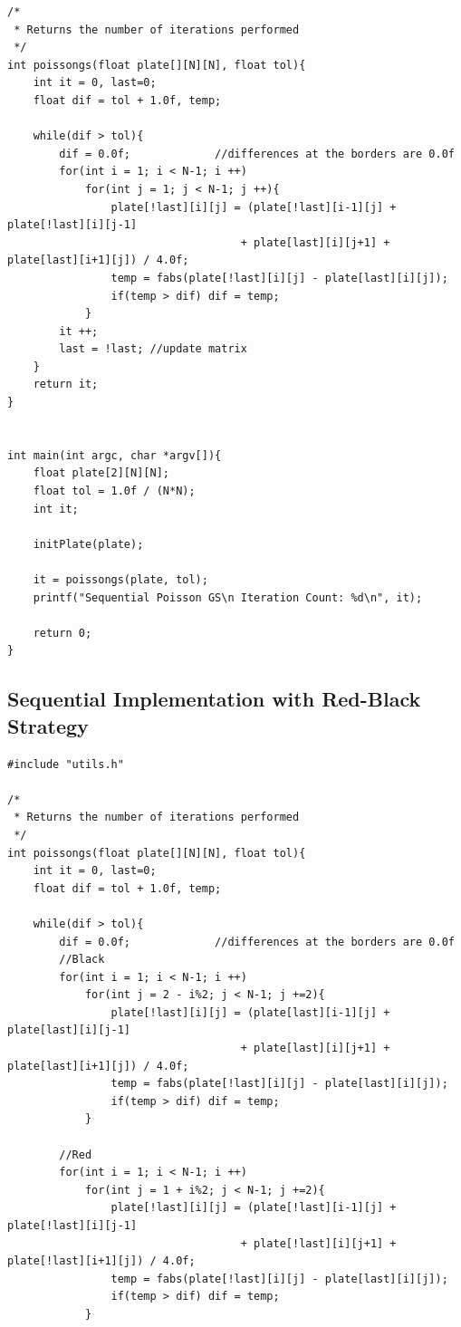 \documentclass{article}
\begin{document}
\begin{appendices}
\begin{framed}
\begin{verbatim}
/*
 * Returns the number of iterations performed
 */
int poissongs(float plate[][N][N], float tol){
    int it = 0, last=0;
    float dif = tol + 1.0f, temp;

    while(dif > tol){
        dif = 0.0f;             //differences at the borders are 0.0f
        for(int i = 1; i < N-1; i ++)
            for(int j = 1; j < N-1; j ++){
                plate[!last][i][j] = (plate[!last][i-1][j] + plate[!last][i][j-1] 
                                    + plate[last][i][j+1] + plate[last][i+1][j]) / 4.0f;
                temp = fabs(plate[!last][i][j] - plate[last][i][j]);
                if(temp > dif) dif = temp;
            }
        it ++;
        last = !last; //update matrix
    }
    return it;
}


int main(int argc, char *argv[]){
    float plate[2][N][N];
    float tol = 1.0f / (N*N);
    int it;

    initPlate(plate);

    it = poissongs(plate, tol);
    printf("Sequential Poisson GS\n Iteration Count: %d\n", it);

    return 0;
}
\end{verbatim}
\end{framed}

\subsection{Sequential Implementation with Red-Black Strategy}\label{seqRBImp}
\begin{framed}
\begin{verbatim}
#include "utils.h"

/*
 * Returns the number of iterations performed
 */
int poissongs(float plate[][N][N], float tol){
    int it = 0, last=0;
    float dif = tol + 1.0f, temp;

    while(dif > tol){
        dif = 0.0f;             //differences at the borders are 0.0f
        //Black
        for(int i = 1; i < N-1; i ++)
            for(int j = 2 - i%2; j < N-1; j +=2){
                plate[!last][i][j] = (plate[last][i-1][j] + plate[last][i][j-1] 
                                    + plate[last][i][j+1] + plate[last][i+1][j]) / 4.0f;
                temp = fabs(plate[!last][i][j] - plate[last][i][j]);
                if(temp > dif) dif = temp;
            }

        //Red
        for(int i = 1; i < N-1; i ++)
            for(int j = 1 + i%2; j < N-1; j +=2){
                plate[!last][i][j] = (plate[!last][i-1][j] + plate[!last][i][j-1] 
                                    + plate[!last][i][j+1] + plate[!last][i+1][j]) / 4.0f;
                temp = fabs(plate[!last][i][j] - plate[last][i][j]);
                if(temp > dif) dif = temp;
            }


\end{verbatim}
\end{framed}
\end{appendices}
\end{document}
